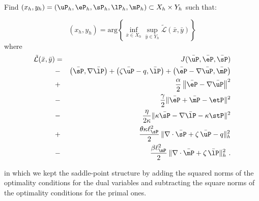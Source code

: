 \begin{tcolorbox}[colback=black!10!white, boxrule=0pt, halign=justify]
	\begin{problem*}[P2$_{h}$]
		Find $(x_h,y_h)=\left ( \uP_h, \eP_h, \sP_h, \lP_h, \mP_h\right ) \subset X_h\times Y_h$ such that:
		
		\begin{equation}
			(x_h,y_h)= \mbox{arg} \left \{ \inf_{\bar{x}\in X_h} \sup_{\bar{y}\in Y_h} 
			\tilde{\mathcal{L}}(\bar{x},\bar{y})
			\right \}
		\end{equation}
		where
		\begin{eqnarray}
			\tilde{\mathcal{L}}(\bar{x},\bar{y})&=&J(\bar{\uP},\bar{\eP},\bar{\sP}) \nonumber \\
			&-&\left ( \bar{\sP},\nabla \bar{\lP} \right ) + \left (\zeta \bar{\uP} - q , \bar{\lP} \right )  
			+ \left ( \bar{\eP}-\nabla \bar{\uP}, \bar{\mP} \right ) \nonumber \\
			&+&\frac{\alpha}{2} \left \| \bar{\eP} - \nabla \bar{\uP} \right \|^2 \nonumber \\
			&-&\frac{\gamma}{2} \|\bar{\eP}+\bar{\mP}-\etP\|^2 \nonumber \\
			&-&\frac{\eta}{2\kappa} \|\kappa \bar{\sP} - \nabla \bar{\lP} - \kappa \stP\|^2 \nonumber \\
			&+& \frac{\theta \kappa \ell_{\sP}^2 }{2}\, \|\nabla \cdot \bar{\sP} + \zeta\, \bar{\uP} - q \|_h^2 \nonumber \\
			&-& \frac{\beta \ell_{\mP}^2 }{2}\, \|\nabla \cdot \bar{\mP} + \zeta\, \bar{\lP} \|_h^2~.
		\end{eqnarray}
	\end{problem*}
\end{tcolorbox}
\noindent
in which we kept the saddle-point structure by adding the squared norms of the optimality conditions for the dual variables and subtracting the square norms of the optimality conditions for the primal ones.

